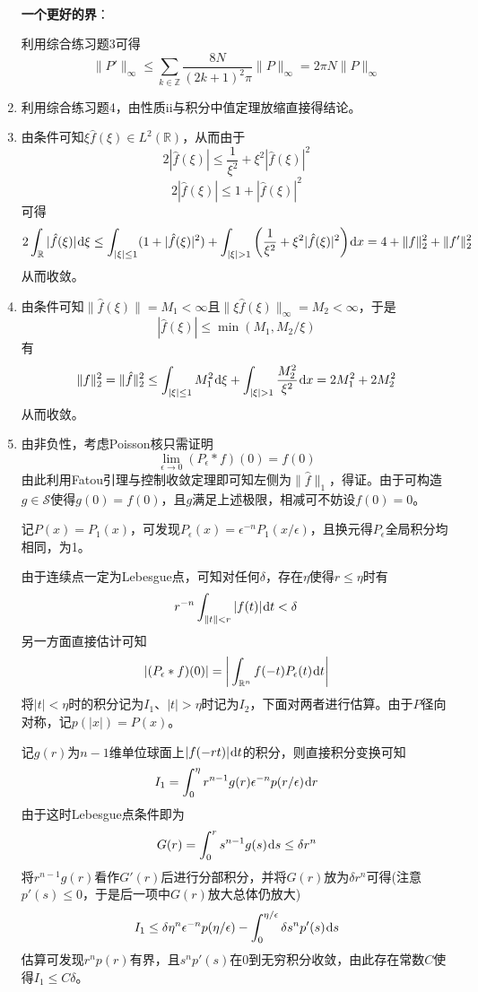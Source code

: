 \documentclass[a4paper,UTF8,fontset=windows]{ctexart}
\newcommand*{\dr}{\hspace{0.07em}\mathrm{d}}
\begin{document}
\begin{enumerate}
    \

    \textbf{一个更好的界}：

    利用综合练习题3可得
    $$\|P'\|_\infty\le\sum_{k\in\mathbb{Z}}\frac{8N}{(2k+1)^2\pi}\|P\|_\infty=2\pi N\|P\|_\infty$$
    

    \item 利用综合练习题4，由性质ii与积分中值定理放缩直接得结论。


    \item 由条件可知$\xi\hat{f}(\xi)\in L^2(\mathbb{R})$，从而由于
    $$2|\hat{f}(\xi)|\le\frac{1}{\xi^2}+\xi^2|\hat{f}(\xi)|^2$$
    $$2|\hat{f}(\xi)|\le1+|\hat{f}(\xi)|^2$$
    可得
    $$2\int_{\mathbb{R}}|\hat{f}(\xi)|\dr\xi\le\int_{|\xi|\le1}(1+|\hat{f}(\xi)|^2)+\int_{|\xi|>1}\bigg(\frac{1}{\xi^2}+\xi^2|\hat{f}(\xi)|^2\bigg)\dr x=4+\|f\|_2^2+\|f'\|_2^2$$
    从而收敛。

    \item 由条件可知$\|\hat{f}(\xi)\|=M_1<\infty$且$\|\xi\hat{f}(\xi)\|_\infty=M_2<\infty$，于是
    $$|\hat{f}(\xi)|\le\min(M_1,M_2/\xi)$$
    有
    $$\|f\|_2^2=\|\hat{f}\|_2^2\le\int_{|\xi|\le 1}M_1^2\dr\xi+\int_{|\xi|>1}\frac{M_2^2}{\xi^2}\dr x=2M_1^2+2M_2^2$$
    从而收敛。

    \item 由非负性，考虑Poisson核只需证明
    $$\lim_{\epsilon\to0}(P_\epsilon*f)(0)=f(0)$$
    由此利用Fatou引理与控制收敛定理即可知左侧为$\|\hat{f}\|_1$，得证。由于可构造$g\in\mathcal{S}$使得$g(0)=f(0)$，且$g$满足上述极限，相减可不妨设$f(0)=0$。

    记$P(x)=P_1(x)$，可发现$P_\epsilon(x)=\epsilon^{-n}P_1(x/\epsilon)$，且换元得$P_\epsilon$全局积分均相同，为1。

    由于连续点一定为Lebesgue点，可知对任何$\delta$，存在$\eta$使得$r\le\eta$时有
    $$r^{-n}\int_{\|t\|<r}|f(t)|\dr t<\delta$$
    另一方面直接估计可知
    $$|(P_\epsilon*f)(0)|=\bigg|\int_{\mathbb{R}^n}f(-t)P_\epsilon(t)\dr t\bigg|$$
    将$|t|<\eta$时的积分记为$I_1$、$|t|>\eta$时记为$I_2$，下面对两者进行估算。由于$P$径向对称，记$p(|x|)=P(x)$。

    记$g(r)$为$n-1$维单位球面上$|f(-rt)|\dr t$的积分，则直接积分变换可知
    $$I_1=\int_0^\eta r^{n-1}g(r)\epsilon^{-n}p(r/\epsilon)\dr r$$
    由于这时Lebesgue点条件即为
    $$G(r)=\int_0^rs^{n-1}g(s)\dr s\le\delta r^n$$
    将$r^{n-1}g(r)$看作$G'(r)$后进行分部积分，并将$G(r)$放为$\delta r^n$可得(注意$p'(s)\le0$，于是后一项中$G(r)$放大总体仍放大)
    $$I_1\le\delta\eta^n\epsilon^{-n}p(\eta/\epsilon)-\int_0^{\eta/\epsilon}\delta s^np'(s)\dr s$$
    估算可发现$r^np(r)$有界，且$s^np'(s)$在0到无穷积分收敛，由此存在常数$C$使得$I_1\le C\delta$。


\end{enumerate}
\end{document}
